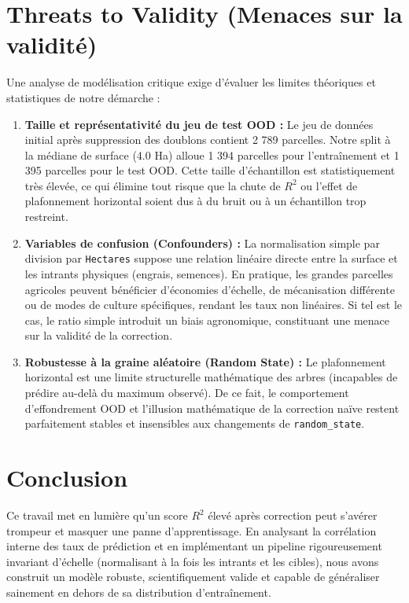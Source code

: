\documentclass[11pt,a4paper]{article}
\begin{document}
\section{Threats to Validity (Menaces sur la validité)}
Une analyse de modélisation critique exige d'évaluer les limites théoriques et statistiques de notre démarche :
\begin{enumerate}
    \item \textbf{Taille et représentativité du jeu de test OOD :} Le jeu de données initial après suppression des doublons contient 2 789 parcelles. Notre split à la médiane de surface (4.0 Ha) alloue 1 394 parcelles pour l'entraînement et 1 395 parcelles pour le test OOD. Cette taille d'échantillon est statistiquement très élevée, ce qui élimine tout risque que la chute de $R^2$ ou l'effet de plafonnement horizontal soient dus à du bruit ou à un échantillon trop restreint.
    \item \textbf{Variables de confusion (Confounders) :} La normalisation simple par division par \texttt{Hectares} suppose une relation linéaire directe entre la surface et les intrants physiques (engrais, semences). En pratique, les grandes parcelles agricoles peuvent bénéficier d'économies d'échelle, de mécanisation différente ou de modes de culture spécifiques, rendant les taux non linéaires. Si tel est le cas, le ratio simple introduit un biais agronomique, constituant une menace sur la validité de la correction.
    \item \textbf{Robustesse à la graine aléatoire (Random State) :} Le plafonnement horizontal est une limite structurelle mathématique des arbres (incapables de prédire au-delà du maximum observé). De ce fait, le comportement d'effondrement OOD et l'illusion mathématique de la correction naïve restent parfaitement stables et insensibles aux changements de \texttt{random\_state}.
\end{enumerate}

\section{Conclusion}
Ce travail met en lumière qu'un score $R^2$ élevé après correction peut s'avérer trompeur et masquer une panne d'apprentissage. En analysant la corrélation interne des taux de prédiction et en implémentant un pipeline rigoureusement invariant d'échelle (normalisant à la fois les intrants et les cibles), nous avons construit un modèle robuste, scientifiquement valide et capable de généraliser sainement en dehors de sa distribution d'entraînement.
\end{document}
